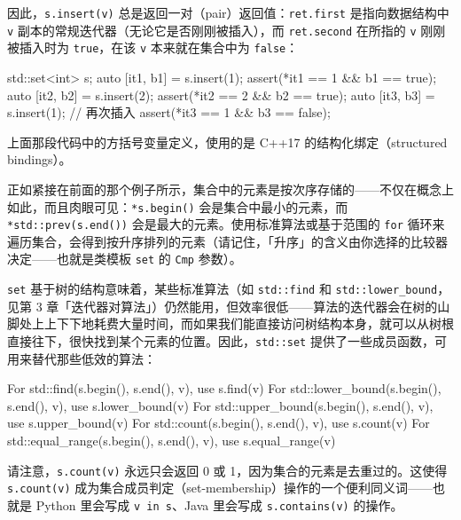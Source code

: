 因此，\texttt{s.\allowbreak{}insert(\allowbreak{}v)\allowbreak{}} 总是返回一对（pair）返回值：\texttt{ret.\allowbreak{}first} 是指向数据结构中 \texttt{v} 副本的常规迭代器（无论它是否刚刚被插入），而 \texttt{ret.\allowbreak{}second} 在所指的 \texttt{v} 刚刚被插入时为 \texttt{true}，在该 \texttt{v} 本来就在集合中为 \texttt{false}：

\begin{codebox}[cpp]
    std::set<int> s;
    auto [it1, b1] = s.insert(1);
    assert(*it1 == 1 && b1 == true);
    auto [it2, b2] = s.insert(2);
    assert(*it2 == 2 && b2 == true);
    auto [it3, b3] = s.insert(1); // 再次插入
    assert(*it3 == 1 && b3 == false);
\end{codebox}

上面那段代码中的方括号变量定义，使用的是 C++17 的结构化绑定（structured bindings）。

正如紧接在前面的那个例子所示，集合中的元素是按次序存储的——不仅在概念上如此，而且肉眼可见：\texttt{*s.\allowbreak{}begin(\allowbreak{})\allowbreak{}} 会是集合中最小的元素，而 \texttt{*std::\allowbreak{}prev(\allowbreak{}s.\allowbreak{}end(\allowbreak{})\allowbreak{})\allowbreak{}} 会是最大的元素。使用标准算法或基于范围的 \texttt{for} 循环来遍历集合，会得到按升序排列的元素（请记住，「升序」的含义由你选择的比较器决定——也就是类模板 \texttt{set} 的 \texttt{Cmp} 参数）。

\texttt{set} 基于树的结构意味着，某些标准算法（如 \texttt{std::\allowbreak{}find} 和 \texttt{std::\allowbreak{}lower\_\allowbreak{}bound}，见第 3 章「迭代器对算法」）仍然能用，但效率很低——算法的迭代器会在树的山脚处上上下下地耗费大量时间，而如果我们能直接访问树结构本身，就可以从树根直接往下，很快找到某个元素的位置。因此，\texttt{std::\allowbreak{}set} 提供了一些成员函数，可用来替代那些低效的算法：

\begin{codebox}[cpp]
For std::find(s.begin(), s.end(), v), use s.find(v)
For std::lower_bound(s.begin(), s.end(), v), use s.lower_bound(v)
For std::upper_bound(s.begin(), s.end(), v), use s.upper_bound(v)
For std::count(s.begin(), s.end(), v), use s.count(v)
For std::equal_range(s.begin(), s.end(), v), use s.equal_range(v)
\end{codebox}

请注意，\texttt{s.\allowbreak{}count(\allowbreak{}v)\allowbreak{}} 永远只会返回 0 或 1，因为集合的元素是去重过的。这使得 \texttt{s.\allowbreak{}count(\allowbreak{}v)\allowbreak{}} 成为集合成员判定（set-membership）操作的一个便利同义词——也就是 Python 里会写成 \texttt{v in s}、Java 里会写成 \texttt{s.\allowbreak{}contains(\allowbreak{}v)\allowbreak{}} 的操作。

